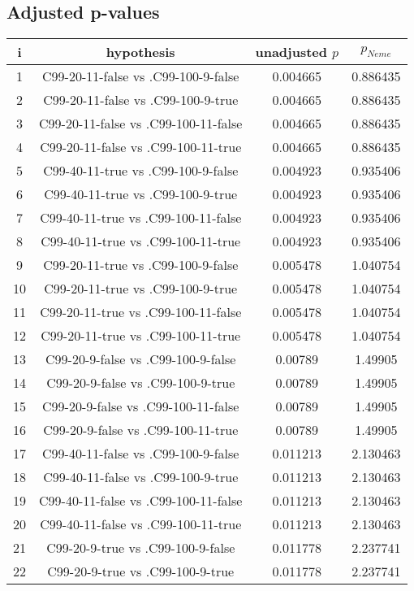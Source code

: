 \documentclass[a4paper,10pt]{article}
\begin{document}
\begin{landscape}
\pagebreak

\subsection{Adjusted p-values}

\begin{table}[!htp]
\centering\scriptsize
\begin{tabular}{cccc}
i&hypothesis&unadjusted $p$&$p_{Neme}$\\
\hline1&C99-20-11-false vs .C99-100-9-false&0.004665&0.886435\\
2&C99-20-11-false vs .C99-100-9-true&0.004665&0.886435\\
3&C99-20-11-false vs .C99-100-11-false&0.004665&0.886435\\
4&C99-20-11-false vs .C99-100-11-true&0.004665&0.886435\\
5&C99-40-11-true vs .C99-100-9-false&0.004923&0.935406\\
6&C99-40-11-true vs .C99-100-9-true&0.004923&0.935406\\
7&C99-40-11-true vs .C99-100-11-false&0.004923&0.935406\\
8&C99-40-11-true vs .C99-100-11-true&0.004923&0.935406\\
9&C99-20-11-true vs .C99-100-9-false&0.005478&1.040754\\
10&C99-20-11-true vs .C99-100-9-true&0.005478&1.040754\\
11&C99-20-11-true vs .C99-100-11-false&0.005478&1.040754\\
12&C99-20-11-true vs .C99-100-11-true&0.005478&1.040754\\
13&C99-20-9-false vs .C99-100-9-false&0.00789&1.49905\\
14&C99-20-9-false vs .C99-100-9-true&0.00789&1.49905\\
15&C99-20-9-false vs .C99-100-11-false&0.00789&1.49905\\
16&C99-20-9-false vs .C99-100-11-true&0.00789&1.49905\\
17&C99-40-11-false vs .C99-100-9-false&0.011213&2.130463\\
18&C99-40-11-false vs .C99-100-9-true&0.011213&2.130463\\
19&C99-40-11-false vs .C99-100-11-false&0.011213&2.130463\\
20&C99-40-11-false vs .C99-100-11-true&0.011213&2.130463\\
21&C99-20-9-true vs .C99-100-9-false&0.011778&2.237741\\
22&C99-20-9-true vs .C99-100-9-true&0.011778&2.237741\\

\end{tabular}
\end{table}
\end{landscape}
\end{document}
